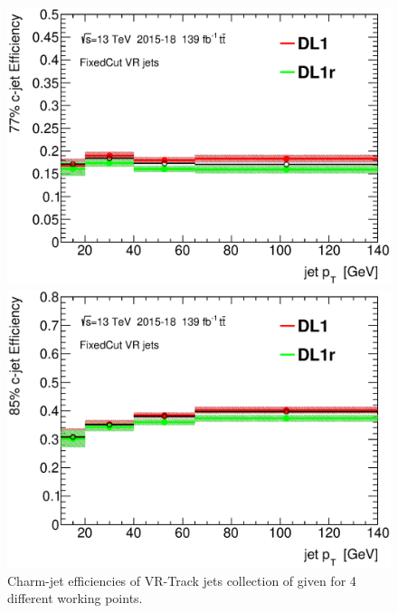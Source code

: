 \documentclass[letterpaper,12pt]{article}
\begin{document}
\begin{figure}[H]
\begin{minipage}[b]{.45\textwidth}
\includegraphics[width=1\textwidth]{SFplots_december/DL1allVRJetsDec_DL1rallVRJetsDec/eff77.eps}
\end{minipage}\hfill
\begin{minipage}[b]{.45\textwidth}
\centering
\includegraphics[width=1\textwidth]{SFplots_december/DL1allVRJetsDec_DL1rallVRJetsDec/eff85.eps}
\end{minipage}
\caption{Charm-jet efficiencies of VR-Track jets collection of 
given for 4 different working points.} \label{fig:Dec_eff_VRJets}
\end{figure}

\end{document}
